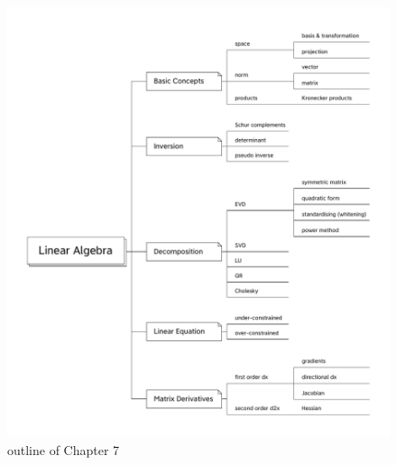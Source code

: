 \begin{figure}[htpb]
    \centering
    \includegraphics[width=.75\textwidth]{figs/linalgoutline.pdf}
    \caption{outline of Chapter 7}
    \label{fig:linalgoutline}
\end{figure}